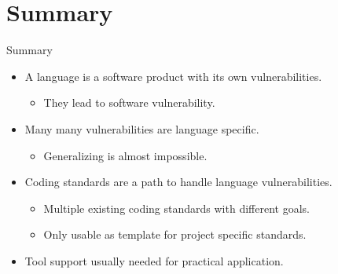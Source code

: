 \section{Summary}

\begin{frame}[t]{Summary}
\begin{itemize}
  \item A language is a software product with its own vulnerabilities.
    \begin{itemize}
      \item They lead to software vulnerability.
    \end{itemize}

  \vfill\pause
  \item Many many vulnerabilities are language specific.
    \begin{itemize}
      \item Generalizing is almost impossible.
    \end{itemize}

  \vfill\pause
  \item Coding standards are a path to handle language vulnerabilities.
    \begin{itemize}
      \item Multiple existing coding standards with different goals.
      \item Only usable as template for project specific standards.
    \end{itemize}

  \vfill\pause
  \item Tool support usually needed for practical application.
\end{itemize}
\end{frame}
